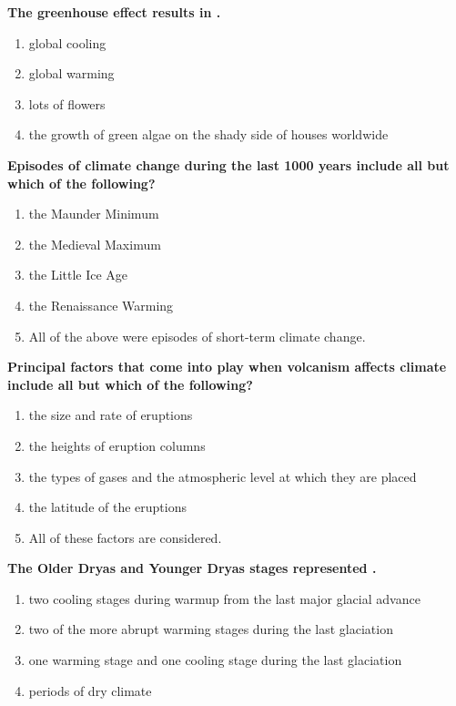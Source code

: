 \item {
\setlength{\itemsep}{0cm}
\setlength{\parskip}{.2cm}
\begin{samepage}
\textbf{
The greenhouse effect results in \makebox[1cm]{\Rivpt\hrulefill\Rivpt}.
}
\begin{enumerate}
\item {  global cooling }
\item {  global warming }
\item {  lots of flowers }
\item {  the growth of green algae on the shady side of houses worldwide }
\end{enumerate}
\end{samepage}
}
\item {
\setlength{\itemsep}{0cm}
\setlength{\parskip}{.2cm}
\begin{samepage}
\textbf{
Episodes of climate change during the last 1000 years include all but which of the following?
}
\begin{enumerate}
\item {  the Maunder Minimum }
\item {  the Medieval Maximum }
\item {  the Little Ice Age }
\item {  the Renaissance Warming }
\item {  All of the above were episodes of short-term climate change. }
\end{enumerate}
\end{samepage}
}
\item {
\setlength{\itemsep}{0cm}
\setlength{\parskip}{.2cm}
\begin{samepage}
\textbf{
Principal factors that come into play when volcanism affects climate include all but which of the following?
}
\begin{enumerate}
\item {  the size and rate of eruptions }
\item {  the heights of eruption columns }
\item {  the types of gases and the atmospheric level at which they are placed }
\item {  the latitude of the eruptions }
\item {  All of these factors are considered. }
\end{enumerate}
\end{samepage}
}
\item {
\setlength{\itemsep}{0cm}
\setlength{\parskip}{.2cm}
\begin{samepage}
\textbf{
The Older Dryas and Younger Dryas stages represented \makebox[1cm]{\Rivpt\hrulefill\Rivpt}.
}
\begin{enumerate}
\item {  two cooling stages during warmup from the last major glacial advance }
\item {  two of the more abrupt warming stages during the last glaciation }
\item {  one warming stage and one cooling stage during the last glaciation }
\item {  periods of dry climate  }
\end{enumerate}
\end{samepage}
}
